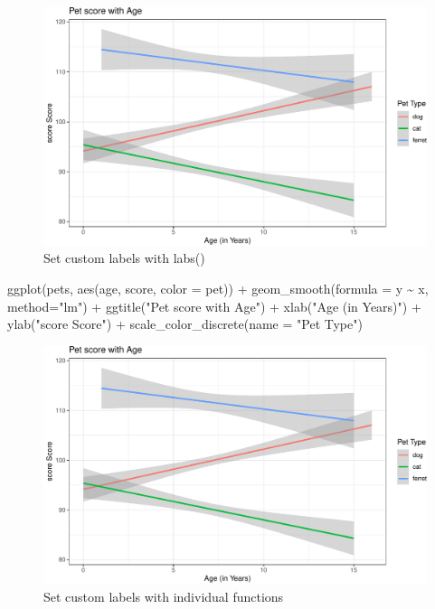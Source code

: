 \documentclass[
  oneside]{book}
\newenvironment{Shaded}{\begin{snugshade}}{\end{snugshade}}
\newcommand{\AttributeTok}[1]{\textcolor[rgb]{0.77,0.63,0.00}{#1}}
\newcommand{\FunctionTok}[1]{\textcolor[rgb]{0.00,0.00,0.00}{#1}}
\newcommand{\NormalTok}[1]{#1}
\newcommand{\SpecialCharTok}[1]{\textcolor[rgb]{0.00,0.00,0.00}{#1}}
\newcommand{\StringTok}[1]{\textcolor[rgb]{0.31,0.60,0.02}{#1}}
\begin{document}
\begin{figure}

{\centering \includegraphics[width=0.9\linewidth]{images/line-labels1-1} 

}

\caption{Set custom labels with labs()}\label{fig:line-labels1}
\end{figure}

\begin{Shaded}
\begin{Highlighting}[]
\FunctionTok{ggplot}\NormalTok{(pets, }\FunctionTok{aes}\NormalTok{(age, score, }\AttributeTok{color =}\NormalTok{ pet)) }\SpecialCharTok{+}
  \FunctionTok{geom\_smooth}\NormalTok{(}\AttributeTok{formula =}\NormalTok{ y }\SpecialCharTok{\textasciitilde{}}\NormalTok{ x, }\AttributeTok{method=}\StringTok{"lm"}\NormalTok{) }\SpecialCharTok{+}
  \FunctionTok{ggtitle}\NormalTok{(}\StringTok{"Pet score with Age"}\NormalTok{) }\SpecialCharTok{+}
  \FunctionTok{xlab}\NormalTok{(}\StringTok{"Age (in Years)"}\NormalTok{) }\SpecialCharTok{+}
  \FunctionTok{ylab}\NormalTok{(}\StringTok{"score Score"}\NormalTok{) }\SpecialCharTok{+}
  \FunctionTok{scale\_color\_discrete}\NormalTok{(}\AttributeTok{name =} \StringTok{"Pet Type"}\NormalTok{)}
\end{Highlighting}
\end{Shaded}

\begin{figure}

{\centering \includegraphics[width=0.9\linewidth]{images/line-labels2-1} 

}

\caption{Set custom labels with individual functions}\label{fig:line-labels2}
\end{figure}
\end{document}
